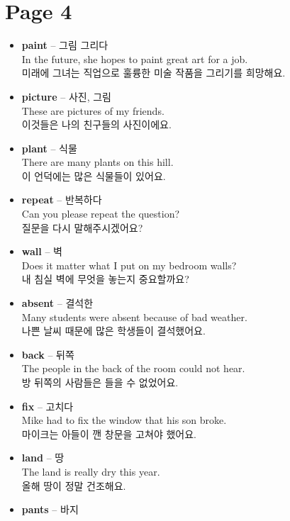 \documentclass[12pt]{article}
\begin{document}
\section*{Page 4}
\begin{itemize}
    \item \textbf{paint} -- 그림 그리다 \\
    In the future, she hopes to paint great art for a job. \\
    미래에 그녀는 직업으로 훌륭한 미술 작품을 그리기를 희망해요.
    \item \textbf{picture} -- 사진, 그림 \\
    These are pictures of my friends. \\
    이것들은 나의 친구들의 사진이에요.
    \item \textbf{plant} -- 식물 \\
    There are many plants on this hill. \\
    이 언덕에는 많은 식물들이 있어요.
    \item \textbf{repeat} -- 반복하다 \\
    Can you please repeat the question? \\
    질문을 다시 말해주시겠어요?
    \item \textbf{wall} -- 벽 \\
    Does it matter what I put on my bedroom walls? \\
    내 침실 벽에 무엇을 놓는지 중요할까요?
    \item \textbf{absent} -- 결석한 \\
    Many students were absent because of bad weather. \\
    나쁜 날씨 때문에 많은 학생들이 결석했어요.
    \item \textbf{back} -- 뒤쪽 \\
    The people in the back of the room could not hear. \\
    방 뒤쪽의 사람들은 들을 수 없었어요.
    \item \textbf{fix} -- 고치다 \\
    Mike had to fix the window that his son broke. \\
    마이크는 아들이 깬 창문을 고쳐야 했어요.
    \item \textbf{land} -- 땅 \\
    The land is really dry this year. \\
    올해 땅이 정말 건조해요.
    \item \textbf{pants} -- 바지 \\

\end{itemize}
\end{document}
